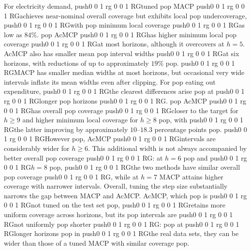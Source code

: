 \documentclass[
  american,
  12pt]{article}
\theoremstyle{plain}
\theoremstyle{plain}
\theoremstyle{remark}
\newcommand{\CPTSadd}[1]{\ifmmode\else\leavevmode\fi\pdfcolorstack 0 push{0 0 1 rg 0 0 1 RG}#1\pdfcolorstack 0 pop}
\begin{document}
For electricity demand, \CPTSadd{tuned} MACP \CPTSadd{achieves near-nominal overall
coverage but exhibits local} undercoverage, \CPTSadd{with} minimum local coverage
\CPTSadd{as low as \(84\%\).} AcMCP \CPTSadd{has higher minimum local} coverage \CPTSadd{at most
horizons, although it overcovers at \(h=5\). AcMCP also has smaller mean}
interval widths \CPTSadd{at six horizons, with reductions of up to approximately
\(19\%\)}. \CPTSadd{MACP has smaller median widths at most horizons, but
occasional very wide intervals inflate its mean widths even after
clipping. For} eating out expenditure, \CPTSadd{the clearest differences arise} at
\CPTSadd{longer} horizons\CPTSadd{.} AcMCP \CPTSadd{has overall} coverage \CPTSadd{closer to the target for
\(h\geq9\) and higher minimum local coverage for \(h\geq8\)}, with \CPTSadd{the
latter improving by approximately \(10\)--\(18.3\) percentage points}.
\CPTSadd{However}, AcMCP \CPTSadd{intervals are considerably wider for \(h\geq6\). This
additional width is not always accompanied by better overall} coverage\CPTSadd{:
at \(h=6\)} and \CPTSadd{\(h=8\)}, \CPTSadd{the two methods have similar overall} coverage\CPTSadd{,
while at \(h=7\) MACP attains higher coverage with narrower intervals.
Overall, tuning the step size substantially narrows the gap between MACP
and AcMCP. AcMCP, which} is \CPTSadd{not tuned on the test set}, \CPTSadd{retains more
uniform coverage across horizons, but its} intervals are \CPTSadd{not uniformly}
shorter\CPTSadd{:} at \CPTSadd{longer horizons} in \CPTSadd{the real data sets, they can be wider
than those of a tuned MACP with similar coverage}.
\end{document}
